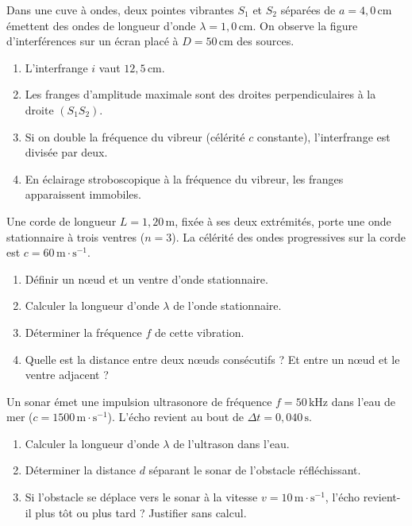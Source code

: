 \documentclass[11pt]{article}
\begin{document}
\begin{exercice}
Dans une cuve à ondes, deux pointes vibrantes $S_1$ et $S_2$ séparées de $a = 4,0\,\text{cm}$ émettent des ondes de longueur d'onde $\lambda = 1,0\,\text{cm}$. On observe la figure d'interférences sur un écran placé à $D = 50\,\text{cm}$ des sources.
\begin{enumerate}
    \item L'interfrange $i$ vaut $12,5\,\text{cm}$.
    \item Les franges d'amplitude maximale sont des droites perpendiculaires à la droite $(S_1S_2)$.
    \item Si on double la fréquence du vibreur (célérité $c$ constante), l'interfrange est divisée par deux.
    \item En éclairage stroboscopique à la fréquence du vibreur, les franges apparaissent immobiles.
\end{enumerate}
\end{exercice}

\begin{exercice}
Une corde de longueur $L = 1,20\,\text{m}$, fixée à ses deux extrémités, porte une onde stationnaire à trois ventres ($n=3$). La célérité des ondes progressives sur la corde est $c = 60\,\text{m}\cdot\text{s}^{-1}$.
\begin{enumerate}
    \item Définir un nœud et un ventre d'onde stationnaire.
    \item Calculer la longueur d'onde $\lambda$ de l'onde stationnaire.
    \item Déterminer la fréquence $f$ de cette vibration.
    \item Quelle est la distance entre deux nœuds consécutifs ? Et entre un nœud et le ventre adjacent ?
\end{enumerate}
\end{exercice}

\begin{exercice}
Un sonar émet une impulsion ultrasonore de fréquence $f = 50\,\text{kHz}$ dans l'eau de mer ($c = 1500\,\text{m}\cdot\text{s}^{-1}$). L'écho revient au bout de $\Delta t = 0,040\,\text{s}$.
\begin{enumerate}
    \item Calculer la longueur d'onde $\lambda$ de l'ultrason dans l'eau.
    \item Déterminer la distance $d$ séparant le sonar de l'obstacle réfléchissant.
    \item Si l'obstacle se déplace vers le sonar à la vitesse $v = 10\,\text{m}\cdot\text{s}^{-1}$, l'écho revient-il plus tôt ou plus tard ? Justifier sans calcul.
\end{enumerate}
\end{exercice}
\end{document}
